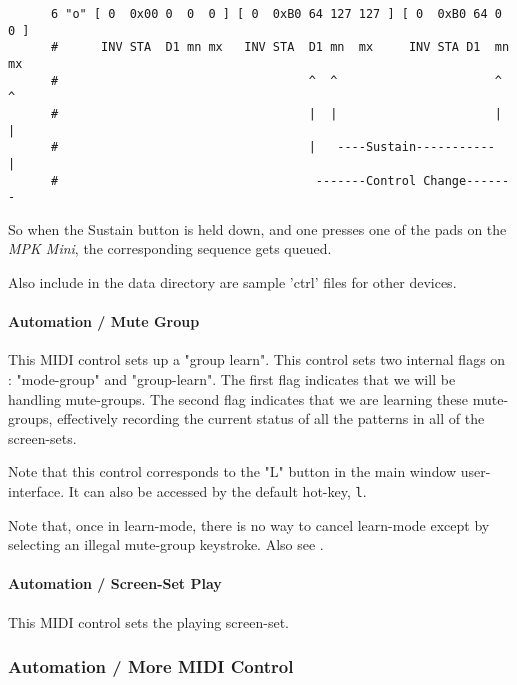    \begin{verbatim}
      6 "o" [ 0  0x00 0  0  0 ] [ 0  0xB0 64 127 127 ] [ 0  0xB0 64 0  0 ]
      #      INV STA  D1 mn mx   INV STA  D1 mn  mx     INV STA D1  mn mx
      #                                   ^  ^                      ^  ^
      #                                   |  |                      |  |
      #                                   |   ----Sustain-----------   |
      #                                    -------Control Change-------
   \end{verbatim}

   So when the Sustain button is held down, and one presses one of the pads
   on the \textsl{MPK Mini}, the corresponding sequence gets queued.

   Also include in the data directory are sample 'ctrl' files for other devices.

\paragraph{Automation / Mute Group}
\label{paragraph:configuration_midi_ctrl_modgmute}

   This MIDI control sets up a "group learn".
   This control sets two internal flags on : "mode-group" and "group-learn".
   The first flag indicates that we will be handling mute-groups.
   The second flag indicates that we are learning these mute-groups,
   effectively recording the current status of all the patterns in all of the
   screen-sets.

   Note that this control corresponds to the "L" button in the main window
   user-interface.
   It can also be accessed by the default hot-key, \texttt{l}.

   Note that, once in learn-mode, there is no way to cancel learn-mode
   except by selecting an illegal mute-group keystroke.
   Also see .

\paragraph{Automation / Screen-Set Play}
\label{paragraph:configuration_midi_ctrl_ssplay}

This MIDI control sets the playing screen-set.

\subsubsection{Automation / More MIDI Control}
\label{subsubsec:configuration_midi_ctrl_automationex}

